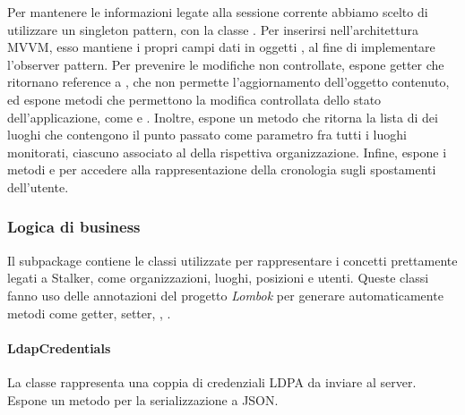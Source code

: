 \documentclass[../../manuale-manutentore.tex]{subfiles}
\begin{document}
Per mantenere le informazioni legate alla sessione corrente abbiamo scelto di utilizzare un singleton pattern, con la classe .
Per inserirsi nell'architettura MVVM, esso mantiene i propri campi dati in oggetti , al fine di implementare l'observer pattern.
Per prevenire le modifiche non controllate, espone getter che ritornano reference a , che non permette l'aggiornamento dell'oggetto contenuto, ed espone metodi che permettono la modifica controllata dello stato dell'applicazione, come  e \linebreak{}.
Inoltre, espone un metodo  che ritorna la lista di  dei luoghi che contengono il punto passato come parametro fra tutti i luoghi monitorati, ciascuno associato al  della rispettiva organizzazione.
Infine, espone i metodi \linebreak{} e  per accedere alla rappresentazione della cronologia sugli spostamenti dell'utente.

\subsubsection{Logica di business}%
\label{subs:logica_di_business}

Il subpackage  contiene le classi utilizzate per rappresentare i concetti prettamente legati a Stalker, come organizzazioni, luoghi, posizioni e utenti.
Queste classi fanno uso delle annotazioni del progetto \textit{Lombok} per generare automaticamente metodi come getter, setter, , .

\paragraph{LdapCredentials}%
\label{par:ldapcredentials}

La classe  rappresenta una coppia di credenziali LDPA da inviare al server.
Espone un metodo per la serializzazione a JSON\@.


\paragraph[Organization]{}%
\label{par:app/organization}
\end{document}
